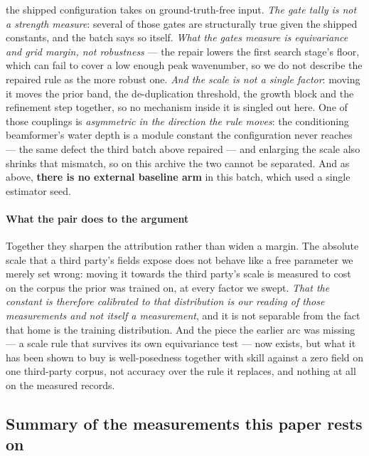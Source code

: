 \documentclass[review]{elsarticle}
\begin{document}
the shipped configuration takes on ground-truth-free input. \emph{The gate tally is not a strength measure}: several of those gates are
structurally true given the shipped constants, and the batch says so itself.
\emph{What the gates measure is equivariance and grid margin, not robustness} --- the
repair lowers the first search stage's floor, which can fail to cover a low enough
peak wavenumber, so we do not describe the repaired rule as the more robust one.
\emph{And the scale is not a single factor}: moving it moves the prior band, the
de-duplication threshold, the growth block and the refinement step together, so no
mechanism inside it is singled out here. One of those couplings is
\emph{asymmetric in the direction the rule moves}: the conditioning beamformer's
water depth is a module constant the configuration never reaches --- the same defect
the third batch above repaired --- and enlarging the scale also shrinks that
mismatch, so on this archive the two cannot be separated. And as above, \textbf{there is no external
baseline arm} in this batch, which used a single estimator seed.

\paragraph{What the pair does to the argument} Together they sharpen the
attribution rather than widen a margin. The absolute scale that a third party's
fields expose does not behave like a free parameter we merely set wrong: moving it
towards the third party's scale is measured to cost on the corpus the prior was
trained on, at every factor we swept. \emph{That the constant is therefore
\emph{calibrated} to that distribution is our reading of those measurements and not
itself a measurement}, and it is not separable from the fact that home is the
training distribution. And the
piece the earlier arc was missing --- a scale rule that survives its own equivariance
test --- now exists, but what it has been shown to buy is well-posedness together
with skill against a zero field on one third-party corpus, not accuracy over the rule
it replaces, and nothing at all on the measured records.

\subsection{Summary of the measurements this paper rests on}
\label{sec:res_summary}

\end{document}
